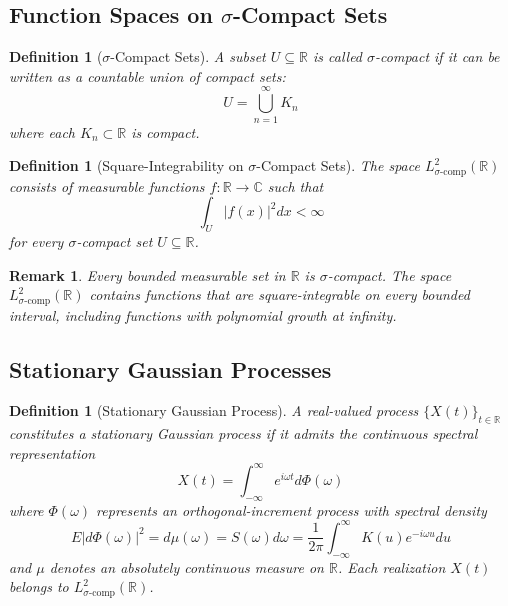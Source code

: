 \documentclass{article}
\newtheorem{definition}[theorem]{Definition}
\newtheorem{remark}[theorem]{Remark}
\begin{document}
\subsection{Function Spaces on $\sigma$-Compact Sets}

\begin{definition}[$\sigma$-Compact Sets]\label{def:sigma_compact}
A subset $U \subseteq \mathbb{R}$ is called $\sigma$-compact if it can be written as a countable union of compact sets:
\begin{equation}
U = \bigcup_{n=1}^{\infty} K_n
\end{equation}
where each $K_n \subset \mathbb{R}$ is compact.
\end{definition}

\begin{definition}[Square-Integrability on $\sigma$-Compact Sets]\label{def:L2_sigma_compact}
The space $L^2_{\sigma\text{-comp}}(\mathbb{R})$ consists of measurable functions $f: \mathbb{R} \to \mathbb{C}$ such that
\begin{equation}
\int_U |f(x)|^2 dx < \infty
\end{equation}
for every $\sigma$-compact set $U \subseteq \mathbb{R}$.
\end{definition}

\begin{remark}\label{rem:sigma_compact_properties}
Every bounded measurable set in $\mathbb{R}$ is $\sigma$-compact. The space $L^2_{\sigma\text{-comp}}(\mathbb{R})$ contains functions that are square-integrable on every bounded interval, including functions with polynomial growth at infinity.
\end{remark}

\subsection{Stationary Gaussian Processes}

\begin{definition}[Stationary Gaussian Process]\label{def:stationary}
A real-valued process $\{X(t)\}_{t \in \mathbb{R}}$ constitutes a stationary Gaussian process if it admits the continuous spectral representation
\begin{equation}
\label{eq:stationary_rep}
X(t) = \int_{-\infty}^{\infty} e^{i\omega t} d\Phi(\omega)
\end{equation}
where $\Phi(\omega)$ represents an orthogonal-increment process with spectral density
\begin{equation}
E|d\Phi(\omega)|^2 = d\mu(\omega) = S(\omega) d\omega = \frac{1}{2\pi} \int_{-\infty}^{\infty} K(u) e^{-i\omega u} du
\end{equation}
and $\mu$ denotes an absolutely continuous measure on $\mathbb{R}$. Each realization $X(t)$ belongs to $L^2_{\sigma\text{-comp}}(\mathbb{R})$.
\end{definition}
\end{document}
